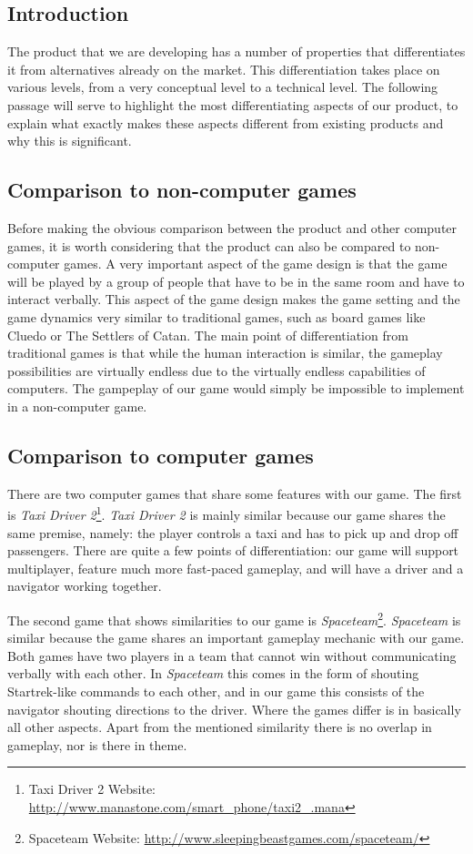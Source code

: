 

\subsection{Introduction}
The product that we are developing has a number of properties that differentiates it from alternatives already on the market. This differentiation takes place on various levels, from a very conceptual level to a technical level. The following passage will serve to highlight the most differentiating aspects of our product, to explain what exactly makes these aspects different from existing products and why this is significant.

\subsection{Comparison to non-computer games}
Before making the obvious comparison between the product and other computer games, it is worth considering that the product can also be compared to non-computer games. A very important aspect of the game design is that the game will be played by a group of people that have to be in the same room and have to interact verbally. This aspect of the game design makes the game setting and the game dynamics very similar to traditional games, such as board games like Cluedo or The Settlers of Catan. The main point of differentiation from traditional games is that while the human interaction is similar, the gameplay possibilities are virtually endless due to the virtually endless capabilities of computers. The gampeplay of our game would simply be impossible to implement in a non-computer game.

\subsection{Comparison to computer games}
There are two computer games that share some features with our game. The first is \emph{Taxi Driver 2}\footnote{Taxi Driver 2 Website: \url{http://www.manastone.com/smart_phone/taxi2_.mana}}. \emph{Taxi Driver 2} is mainly similar because our game shares the same premise, namely: the player controls a taxi and has to pick up and drop off passengers. There are quite a few points of differentiation: our game will support multiplayer, feature much more fast-paced gameplay, and will have a driver and a navigator working together.

The second game that shows similarities to our game is \emph{Spaceteam}\footnote{Spaceteam Website:  \url{http://www.sleepingbeastgames.com/spaceteam/}}. \emph{Spaceteam} is similar because the game shares an important gameplay mechanic with our game. Both games have two players in a team that cannot win without communicating verbally with each other. In \emph{Spaceteam} this comes in the form of shouting Startrek-like commands to each other, and in our game this consists of the navigator shouting directions to the driver. Where the games differ is in basically all other aspects. Apart from the mentioned similarity there is no overlap in gameplay, nor is there in theme.

